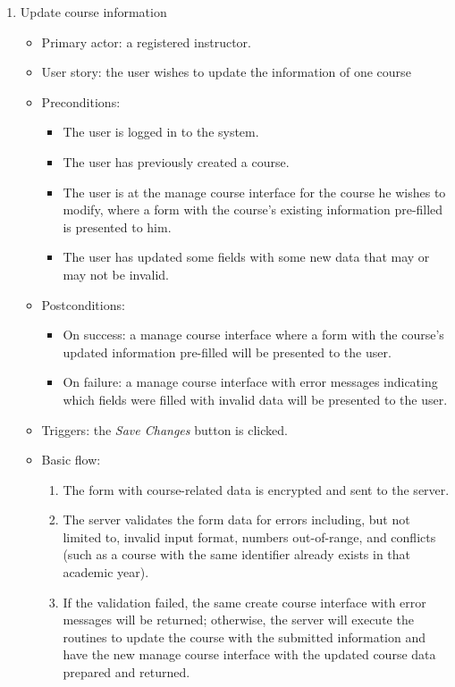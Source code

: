 \begin{enumerate}
\item Update course information
\begin{itemize}
    \item Primary actor: a registered instructor.
    \item User story: the user wishes to update the information of one course
    \item Preconditions:
        \begin{itemize}
            \item The user is logged in to the system.
            \item The user has previously created a course.
            \item The user is at the manage course interface for the course he
                wishes to modify, where a form with
                the course's existing information pre-filled is presented to
                him.
            \item The user has updated some fields with some new data that may
                or may not be invalid.
        \end{itemize}
    \item Postconditions:
        \begin{itemize}
            \item On success: a manage course interface where a form with
                the course's updated information pre-filled will be presented
                to the user.
            \item On failure: a manage course interface with error messages
                indicating which fields were filled with invalid data will be
                presented to the user.
        \end{itemize}
    \item Triggers: the \emph{Save Changes} button is clicked.
    \item Basic flow:
        \begin{enumerate}
            \item The form with course-related data is encrypted and sent to
                the server.
            \item The server validates the form data for errors including,
                but not limited to, invalid input format, numbers out-of-range,
                and conflicts (such as a course with the same identifier  
                already exists in that academic year).
            \item If the validation failed, the same create course interface
                with error messages will be returned; otherwise, the server will
                execute the routines to update the course with the submitted 
                information and have the new manage course interface with the
                updated course data prepared and returned.
        \end{enumerate}
\end{itemize}


\end{enumerate}
